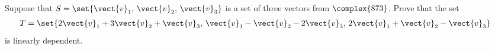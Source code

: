 Suppose that $S=\set{\vect{v}_1,\,\vect{v}_2,\,\vect{v}_3}$ is a set of three vectors from $\complex{873}$.  Prove that the set
%
\begin{align*}
T&=
\set{
2\vect{v}_1+3\vect{v}_2+\vect{v}_3,\,
\vect{v}_1-\vect{v}_2-2\vect{v}_3,\,
2\vect{v}_1+\vect{v}_2-\vect{v}_3
}
\end{align*}
%
is linearly dependent.